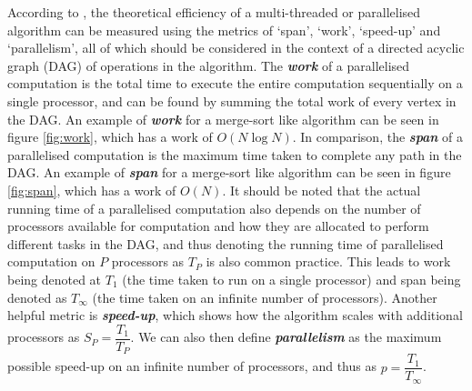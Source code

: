 \documentclass{article}
\begin{document}
According to \cite{CLRS_parallel}, the theoretical efficiency of a multi-threaded or parallelised algorithm can be measured using the metrics of `span', `work', `speed-up' and `parallelism', all of which should be considered in the context of a directed acyclic graph (DAG) of operations in the algorithm.
The \textit{\textbf{work}} of a parallelised computation is the total time to execute the entire computation sequentially on a single processor, and can be found by summing the total work of every vertex in the DAG.
An example of \textit{\textbf{work}} for a merge-sort like algorithm can be seen in figure \ref{fig:work}, which has a work of \(O(N\log{N})\).
In comparison, the \textit{\textbf{span}} of a parallelised computation is the maximum time taken to complete any path in the DAG.
An example of \textit{\textbf{span}} for a merge-sort like algorithm can be seen in figure \ref{fig:span}, which has a work of \(O(N)\).
It should be noted that the actual running time of a parallelised computation also depends on the number of processors available for computation and how they are allocated to perform different tasks in the DAG, and thus denoting the running time of parallelised computation on \(P\) processors as \(T_P\) is also common practice.
This leads to work being denoted at \(T_1\) (the time taken to run on a single processor) and span being denoted as \(T_\infty\) (the time taken on an infinite number of processors).
Another helpful metric is \textit{\textbf{speed-up}}, which shows how the algorithm scales with additional processors as \(S_P = \dfrac{T_1}{T_P}\).
We can also then define \textit{\textbf{parallelism}} as the maximum possible speed-up on an infinite number of processors, and thus as \(p = \dfrac{T_1}{T_\infty}\).
\end{document}
